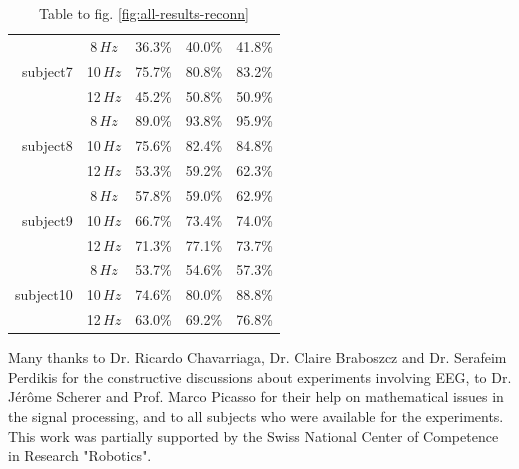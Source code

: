 \documentclass[smallextended]{svjour3}
\begin{document}
\begin{table}
\begin{center}
\begin{tabular}{ r | c | c | c | c }
        \hline

        \multirow{3}{*}{subject7} &  8\,$Hz$ & 36.3\% & 40.0\% & 41.8\% \\
                                  & 10\,$Hz$ & 75.7\% & 80.8\% & 83.2\% \\
                                  & 12\,$Hz$ & 45.2\% & 50.8\% & 50.9\% \\

        \hline

        \multirow{3}{*}{subject8} &  8\,$Hz$ & 89.0\% & 93.8\% & 95.9\% \\
                                  & 10\,$Hz$ & 75.6\% & 82.4\% & 84.8\% \\
                                  & 12\,$Hz$ & 53.3\% & 59.2\% & 62.3\% \\

        \hline

        \multirow{3}{*}{subject9} &  8\,$Hz$ & 57.8\% & 59.0\% & 62.9\% \\
                                  & 10\,$Hz$ & 66.7\% & 73.4\% & 74.0\% \\
                                  & 12\,$Hz$ & 71.3\% & 77.1\% & 73.7\% \\

        \hline

        \multirow{3}{*}{subject10} &  8\,$Hz$ & 53.7\% & 54.6\% & 57.3\% \\
                                  & 10\,$Hz$ & 74.6\% & 80.0\% & 88.8\% \\
                                  & 12\,$Hz$ & 63.0\% & 69.2\% & 76.8\% \\

    \end{tabular}
    \caption{Table to fig. \ref{fig:all-results-reconn}}
\end{center}\end{table}


\begin{acknowledgement}
Many thanks to Dr. Ricardo Chavarriaga, Dr. Claire Braboszcz and Dr. Serafeim Perdikis for the constructive discussions about experiments involving EEG, to Dr. J\'er\^ome Scherer and Prof. Marco Picasso for their help on mathematical issues in the signal processing, and to all subjects who were available for the experiments. This work was partially supported by the Swiss National Center of Competence in Research "Robotics".
\end{acknowledgement}


\end{document}

